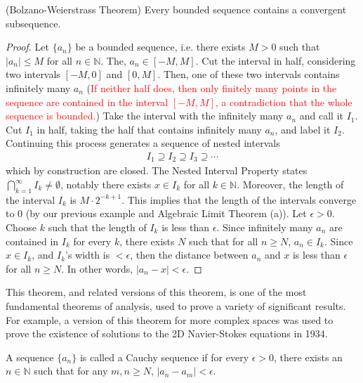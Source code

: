 \documentclass{ximera}
\begin{document}
\begin{theorem}{(Bolzano-Weierstrass Theorem})
    Every bounded sequence contains a convergent subsequence.
\end{theorem}

\begin{proof}
    Let $\{a_n\}$ be a bounded sequence, i.e. there exists $M > 0$ such that $|a_n| \leq M$ for all $n \in \mathbb{N}$.  %
    The, $a_n \in [-M,M]$.  Cut the interval in half, considering two intervals $[-M,0]$ and $[0,M]$.  Then, one of these two intervals contains infinitely many $a_n$ (\textcolor{red}{If neither half does, then only finitely many points in the sequence are contained in the interval $[-M,M]$, a contradiction that the whole sequence is bounded.})  Take the interval with the infinitely many $a_n$ and call it $I_1$.  Cut $I_1$ in half, taking the half that contains infinitely many $a_n$, and label it $I_2$.  Continuing this process generates a sequence of nested intervals 
    \begin{align}
        I_1 \supseteq I_2 \supseteq I_3 \supseteq \cdots
    \end{align}
    which by construction are closed.  The Nested Interval Property states $\bigcap\limits_{k=1}^\infty I_k \neq \emptyset$, notably there exists $x \in I_k$ for all $k \in \mathbb{N}$.  Moreover, the length of the interval $I_k$ is $M\cdot 2^{-k+1}$.  This implies that the length of the intervals converge to $0$ (by our previous example and Algebraic Limit Theorem (a)).  Let $\epsilon > 0$.  Choose $k$ such that the length of $I_k$ is less than $\epsilon$.  Since infinitely many $a_n$ are contained in $I_k$ for every $k$, there exists $N$ such that for all $n \geq N$, $a_n \in I_k$.  Since $x \in I_k$, and $I_k$'s width is $< \epsilon$, then the distance between $a_n $ and $x$ is less than $\epsilon$ for all $n \geq N$.  In other words, $|a_n -x| < \epsilon$.
\end{proof}

This theorem, and related versions of this theorem, is one of the most fundamental theorems of analysis, used to prove a variety of significant results.  For example, a version of this theorem for more complex spaces was used to prove the existence of solutions to the 2D Navier-Stokes equations in 1934.

\begin{definition}
    A sequence $\{a_n\}$ is called a Cauchy sequence if for every $\epsilon > 0$, there exists an $n \in \mathbb{N}$ such that for any $m,n\geq N$, $|a_n-a_m|< \epsilon$.
\end{definition}
\end{document}

